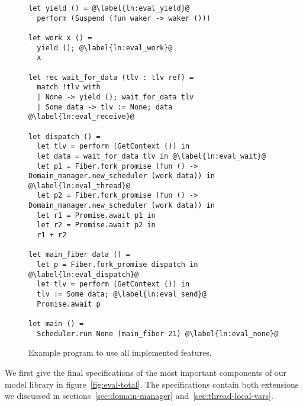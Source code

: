 \begin{figure}[ht]
    \begin{verbatim}
let yield () = @\label{ln:eval_yield}@ 
  perform (Suspend (fun waker -> waker ()))

let work x () = 
  yield (); @\label{ln:eval_work}@
  x

let rec wait_for_data (tlv : tlv ref) =
  match !tlv with
  | None -> yield (); wait_for_data tlv
  | Some data -> tlv := None; data @\label{ln:eval_receive}@

let dispatch () =
  let tlv = perform (GetContext ()) in
  let data = wait_for_data tlv in @\label{ln:eval_wait}@
  let p1 = Fiber.fork_promise (fun () -> Domain_manager.new_scheduler (work data)) in @\label{ln:eval_thread}@
  let p2 = Fiber.fork_promise (fun () -> Domain_manager.new_scheduler (work data)) in
  let r1 = Promise.await p1 in
  let r2 = Promise.await p2 in
  r1 + r2

let main_fiber data () =
  let p = Fiber.fork_promise dispatch in @\label{ln:eval_dispatch}@
  let tlv = perform (GetContext ()) in
  tlv := Some data; @\label{ln:eval_send}@
  Promise.await p

let main () = 
  Scheduler.run None (main_fiber 21) @\label{ln:eval_none}@
\end{verbatim}
    \caption{Example program to use all implemented features.}
    \label{fig:eval_code}
\end{figure}

We first give the final specifications of the most important components of our model library in figure~\ref{fig:eval-total}.
The specifications contain both extensions we discussed in sections~\ref{sec:domain-manager} and~\ref{sec:thread-local-vars}.

